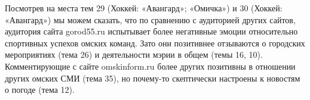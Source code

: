 Посмотрев на места тем 29 (Хоккей: «Авангард»; «Омичка») и 30 (Хоккей: «Авангард») мы можем сказать, что по сравнению с аудиторией других сайтов, аудитория сайта gorod55.ru испытывает более негативные эмоции относительно спортивных успехов омских команд. Зато они позитивнее отзываются о городских мероприятиях (тема 26) и деятельности мэрии в общем (темы 16, 10). Комментирующие с сайте omskinform.ru более других позитивны в отношении других омских СМИ (тема 35), но почему-то скептически настроены к новостям о погоде (тема 12).


\clearpage